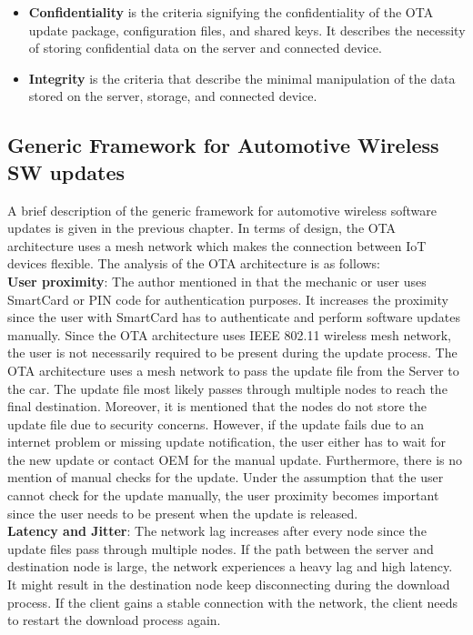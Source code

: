 \documentclass[12pt,a4paper]{article}
\begin{document}
{\begin{itemize}
\item \textbf{Confidentiality} is the criteria signifying the confidentiality of the OTA update package, configuration files, and shared keys. It describes the necessity of storing confidential data on the server and connected device. \cite{r22}

\item \textbf{Integrity} is the criteria that describe the minimal manipulation of the data stored on the server, storage, and connected device. \cite{r22}

\end{itemize}


\subsection{Generic Framework for Automotive Wireless SW updates} \label{Generic Framework for Automotive Wireless SW updates}

A brief description of the generic framework for automotive wireless software updates is given in the previous chapter. In terms of design, the OTA architecture uses a mesh network which makes the connection between IoT devices flexible. The analysis of the OTA architecture is as follows: \\

\textbf{User proximity}: The author mentioned in \cite{r3} that the mechanic or user uses SmartCard or PIN code for authentication purposes. It increases the proximity since the user with SmartCard has to authenticate and perform software updates manually. Since the OTA architecture uses IEEE 802.11 wireless mesh network, the user is not necessarily required to be present during the update process. The OTA architecture uses a mesh network to pass the update file from the Server to the car. The update file most likely passes through multiple nodes to reach the final destination. Moreover, it is mentioned that the nodes do not store the update file due to security concerns. However, if the update fails due to an internet problem or missing update notification, the user either has to wait for the new update or contact OEM for the manual update. Furthermore, there is no mention of manual checks for the update. Under the assumption that the user cannot check for the update manually, the user proximity becomes important since the user needs to be present when the update is released. \cite{r3} \\

\textbf{Latency and Jitter}: The network lag increases after every node since the update files pass through multiple nodes. If the path between the server and destination node is large, the network experiences a heavy lag and high latency. It might result in the destination node keep disconnecting during the download process. If the client gains a stable connection with the network, the client needs to restart the download process again.  \\

}
\end{document}
